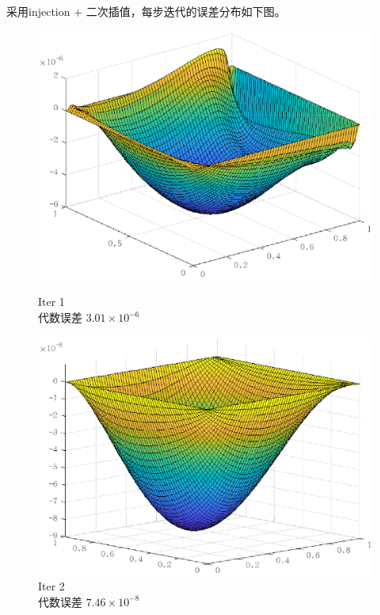 \documentclass[lang=cn,10pt]{elegantbook}
\begin{document}
采用injection + 二次插值，每步迭代的误差分布如下图。
\begin{figure}[H]
  \centering
  \begin{minipage}[t]{0.22\linewidth}
      \centering
      \includegraphics[width=0.84\linewidth]{figure/2-5-9.eps}
      \caption*{\small Iter 1 \\ 代数误差 $3.01\times 10^{-6}$}
  \end{minipage}
  \hspace{1em}
  \begin{minipage}[t]{0.22\linewidth}
    \centering
    \includegraphics[width=0.84\linewidth]{figure/2-5-10.eps}
    \caption*{\small Iter 2 \\ 代数误差 $7.46\times 10^{-8}$}
  \end{minipage}
\end{figure}
\end{document}
